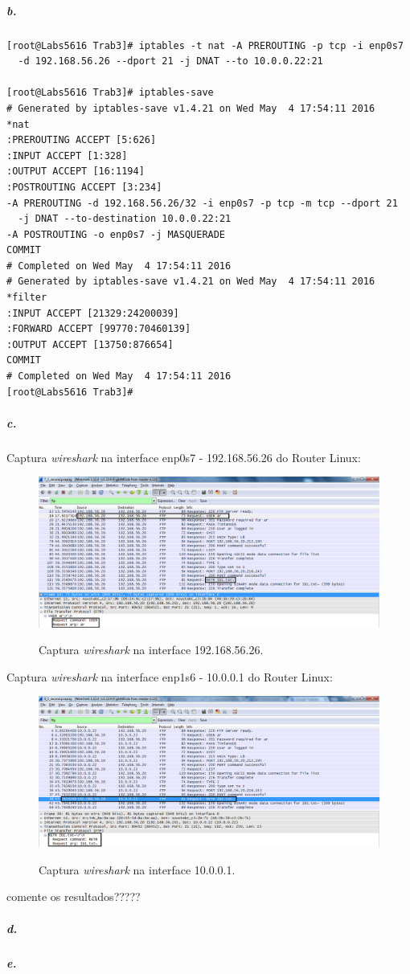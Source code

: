 \subparagraph{b.}
\begin{verbatim}
[root@Labs5616 Trab3]# iptables -t nat -A PREROUTING -p tcp -i enp0s7 
  -d 192.168.56.26 --dport 21 -j DNAT --to 10.0.0.22:21

[root@Labs5616 Trab3]# iptables-save
# Generated by iptables-save v1.4.21 on Wed May  4 17:54:11 2016
*nat
:PREROUTING ACCEPT [5:626]
:INPUT ACCEPT [1:328]
:OUTPUT ACCEPT [16:1194]
:POSTROUTING ACCEPT [3:234]
-A PREROUTING -d 192.168.56.26/32 -i enp0s7 -p tcp -m tcp --dport 21 
  -j DNAT --to-destination 10.0.0.22:21
-A POSTROUTING -o enp0s7 -j MASQUERADE
COMMIT
# Completed on Wed May  4 17:54:11 2016
# Generated by iptables-save v1.4.21 on Wed May  4 17:54:11 2016
*filter
:INPUT ACCEPT [21329:24200039]
:FORWARD ACCEPT [99770:70460139]
:OUTPUT ACCEPT [13750:876654]
COMMIT
# Completed on Wed May  4 17:54:11 2016
[root@Labs5616 Trab3]# 
\end{verbatim}


\subparagraph{c.}
Captura \emph{wireshark} na interface \textsf{enp0s7 - 192.168.56.26} do \textsf{Router Linux}:

\begin{figure}[h]
\centering
\includegraphics[width=1\textwidth, height=0.3\textheight]{5_b-enp0s7.png}
\label{fig:enp0s7}
\caption{Captura \emph{wireshark} na interface \textsf{192.168.56.26}.}
\end{figure}

Captura \emph{wireshark} na interface \textsf{enp1s6 - 10.0.0.1} do \textsf{Router Linux}:

\begin{figure}[h]
\centering
\includegraphics[width=1\textwidth, height=0.3\textheight]{5_b-enp1s6.png}
\label{fig:enp1s6}
\caption{Captura \emph{wireshark} na interface \textsf{10.0.0.1}.}
\end{figure}

comente os resultados?????


\subparagraph{d.}


\subparagraph{e.}

